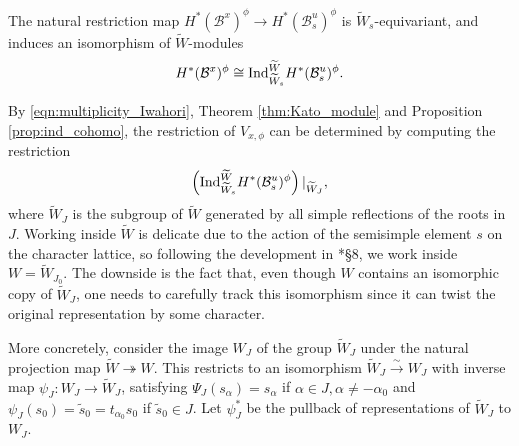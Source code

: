 \begin{proposition}\label{prop:ind_cohomo}\cite{Kato1983}
    The natural restriction map $H^*(\mathcal{B}^x)^\phi\rightarrow H^*(\mathcal{B}_s^u)^\phi$ is $\widetilde{W}_s$-equivariant, and induces an isomorphism of $\widetilde{W}$-modules
    $$H^*(\mathcal{B}^x)^\phi\cong\mathrm{Ind}_{\widetilde{W}_s}^{\widetilde{W}} H^*(\mathcal{B}_s^u)^\phi.$$
\end{proposition}

By \eqref{eqn:multiplicity_Iwahori}, Theorem \ref{thm:Kato_module} and Proposition \ref{prop:ind_cohomo}, the restriction of $V_{x,\phi}$ can be determined by computing the restriction
\begin{equation*}
    \left(\mathrm{Ind}_{\widetilde{W}_s}^{\widetilde{W}}H^*(\mathcal{B}^u_s)^\phi\right)|_{\widetilde{W}_J},
\end{equation*}
where $\widetilde{W}_J$ is the subgroup of $\widetilde{W}$ generated by all simple reflections of the roots in $J$. Working inside $\widetilde{W}$ is delicate due to the action of the semisimple element $s$ on the character lattice, so following the development in \cite{Reeder2000}*{\S 8}, we work inside $W=\widetilde{W}_{J_0}$. The downside is the fact that, even though $W$ contains an isomorphic copy of $\widetilde{W}_J$, one needs to carefully track this isomorphism since it can twist the original representation by some character. 

More concretely, consider the image $W_J$ of the group $\widetilde{W}_J$ under the natural projection map $\widetilde{W}\twoheadrightarrow W$. This restricts to an isomorphism $\widetilde{W}_J\overset{\sim}{\rightarrow} W_J$ with inverse map $\psi_J:W_J\rightarrow \widetilde{W}_J$, satisfying $\Psi_J(s_\alpha)=s_\alpha$ if $\alpha\in J, \alpha\neq-\alpha_0$ and $\psi_J(s_0)=\tilde{s}_0=t_{\alpha_0}s_0$ if $\tilde{s}_0\in J$. Let $\psi_J^*$ be the pullback of representations of $\widetilde{W}_J$ to $W_J$.

